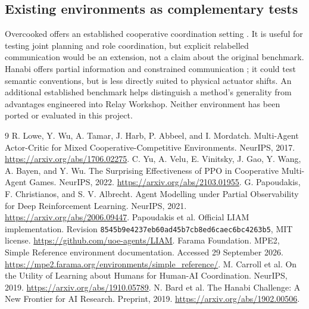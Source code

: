 \documentclass[10pt,a4paper]{article}
\begin{document}
\subsection{Existing environments as complementary tests}

Overcooked offers an established cooperative coordination setting \cite{carroll2019}. It is useful for testing joint planning and role coordination, but explicit relabelled communication would be an extension, not a claim about the original benchmark. Hanabi offers partial information and constrained communication \cite{bard2019}; it could test semantic conventions, but is less directly suited to physical actuator shifts. An additional established benchmark helps distinguish a method's generality from advantages engineered into Relay Workshop. Neither environment has been ported or evaluated in this project.

\begingroup\small
\begin{thebibliography}{9}
\setlength{\itemsep}{2pt}
\setlength{\parskip}{0pt}
 R. Lowe, Y. Wu, A. Tamar, J. Harb, P. Abbeel, and I. Mordatch. Multi-Agent Actor-Critic for Mixed Cooperative-Competitive Environments. NeurIPS, 2017. \url{https://arxiv.org/abs/1706.02275}.
 C. Yu, A. Velu, E. Vinitsky, J. Gao, Y. Wang, A. Bayen, and Y. Wu. The Surprising Effectiveness of PPO in Cooperative Multi-Agent Games. NeurIPS, 2022. \url{https://arxiv.org/abs/2103.01955}.
 G. Papoudakis, F. Christianos, and S. V. Albrecht. Agent Modelling under Partial Observability for Deep Reinforcement Learning. NeurIPS, 2021. \url{https://arxiv.org/abs/2006.09447}.
 Papoudakis et al. Official LIAM implementation. Revision \texttt{8545b9e4237eb60ad45b7cb8ed6caec6bc4263b5}, MIT license. \url{https://github.com/uoe-agents/LIAM}.
 Farama Foundation. MPE2, Simple Reference environment documentation. Accessed 29 September 2026. \url{https://mpe2.farama.org/environments/simple_reference/}.
 M. Carroll et al. On the Utility of Learning about Humans for Human-AI Coordination. NeurIPS, 2019. \url{https://arxiv.org/abs/1910.05789}.
 N. Bard et al. The Hanabi Challenge: A New Frontier for AI Research. Preprint, 2019. \url{https://arxiv.org/abs/1902.00506}.
\end{thebibliography}
\endgroup
\end{document}
